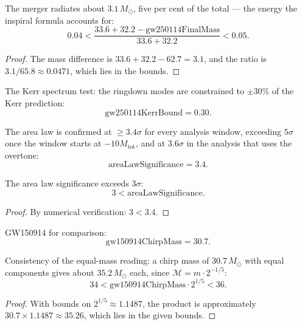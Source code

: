 \begin{theorem}
The merger radiates about $3.1 \, M_\odot$, five per cent of the total — the energy the inspiral formula accounts for:
\[
0.04 < \frac{33.6 + 32.2 - \text{gw250114FinalMass}}{33.6 + 32.2} < 0.05.
\]
\begin{proof}
The mass difference is $33.6 + 32.2 - 62.7 = 3.1$, and the ratio is $3.1 / 65.8 \approx 0.0471$, which lies in the bounds.
\end{proof}
\end{theorem}

\begin{definition}
The Kerr spectrum test: the ringdown modes are constrained to $\pm 30\%$ of the Kerr prediction:
\[
\text{gw250114KerrBound} = 0.30.
\]
\end{definition}

\begin{definition}
The area law is confirmed at $\geq 3.4\sigma$ for every analysis window, exceeding $5\sigma$ once the window starts at $-10 M_{\text{tot}}$, and at $3.6\sigma$ in the analysis that uses the overtone:
\[
\text{areaLawSignificance} = 3.4.
\]
\end{definition}

\begin{theorem}
The area law significance exceeds $3\sigma$:
\[
3 < \text{areaLawSignificance}.
\]
\begin{proof}
By numerical verification: $3 < 3.4$.
\end{proof}
\end{theorem}

\begin{definition}
GW150914 for comparison:
\[
\text{gw150914ChirpMass} = 30.7.
\]
\end{definition}

\begin{theorem}
Consistency of the equal-mass reading: a chirp mass of $30.7 \, M_\odot$ with equal components gives about $35.2 \, M_\odot$ each, since $\mathcal{M} = m \cdot 2^{-1/5}$:
\[
34 < \text{gw150914ChirpMass} \cdot 2^{1/5} < 36.
\]
\begin{proof}
With bounds on $2^{1/5} \approx 1.1487$, the product is approximately $30.7 \times 1.1487 \approx 35.26$, which lies in the given bounds.
\end{proof}
\end{theorem}

